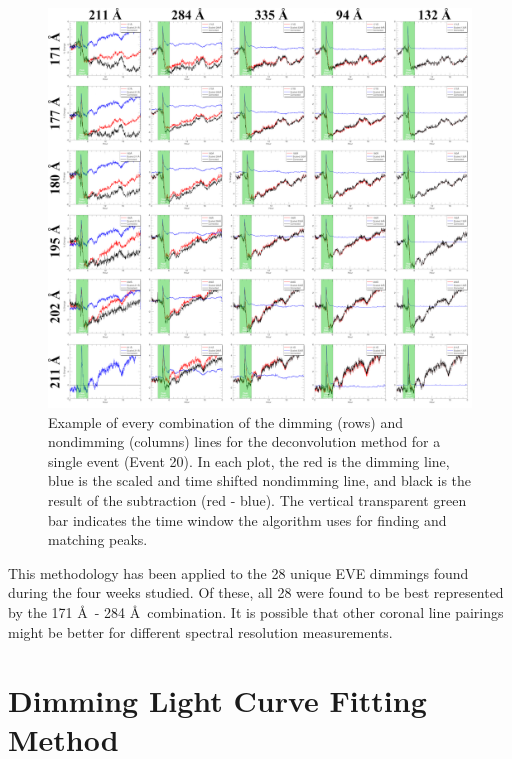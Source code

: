 \begin{figure}[!h]
    \begin{center}
	    \includegraphics[width=\textwidth]{Images/AllDeconvolutionsEvent20.png}
    \end{center}
    \caption[All deconvolution combinations example]{
        Example of every combination of the dimming (rows) and nondimming (columns) lines for the deconvolution method for 
        a single event (Event 20). In each plot, the red is the dimming line, blue is the scaled and time shifted 
        nondimming line, and black is the result of the subtraction (red - blue). The vertical transparent green bar 
        indicates the time window the algorithm uses for finding and matching peaks. 
   	}
    \label{fig:deconvolutioncombinations}
\end{figure}

This methodology has been applied to the 28 unique EVE dimmings found during the four weeks studied. Of these, all 28 were found to be best represented by the 171 \AA\ - 284 \AA\ combination. It is possible that other coronal line pairings might be better for different spectral resolution measurements.

\section{Dimming Light Curve Fitting Method}
\label{sec:fittingmethod}

